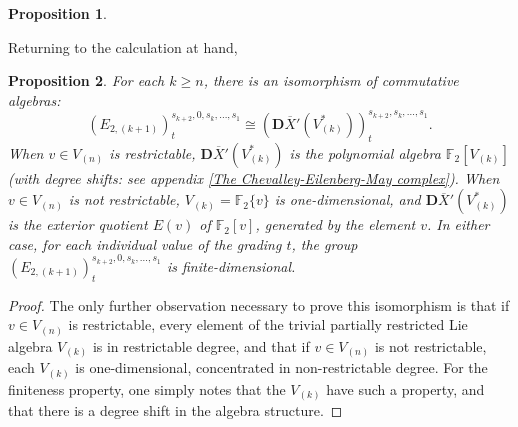 \documentclass[11pt]{amsart}
\theoremstyle{plain}
\newtheorem{thm}{Theorem}[section]
\newtheorem{prop}[thm]{Proposition}
\theoremstyle{definition}
\renewcommand{\to}{\longrightarrow}
\newcommand{\calL}{\mathcal{L}}
\newcommand{\calw}{\mathcal{W}}
\newcommand{\calMv}{\mathcal{M}_\textup{v}}
\newcommand{\calMh}{\mathcal{M}_\textup{h}}
\theoremstyle{plain}
\newcommand{\UEAX}{\overline{X}'}%
\newcommand{\F}{\mathbb{F}}
\newcommand{\Ftwo}{\F_2}
\newcommand{\dual}{\mathbf{D}}
\begin{document}
\begin{Calculations of HWn for n nonzero}
\begin{prop}
\end{prop}
Returning to the calculation at hand,
\begin{prop}\label{calculation in internal dimension zero}
For each $k\geq n$, there is an isomorphism of commutative algebras:
\[(E_{2,(k+1)})^{s_{k+2},0,s_k,\ldots,s_1}_{t}\cong(\dual\UEAX(V^*_{(k)}))^{s_{k+2},s_k,\ldots,s_1}_t.\]
When $v\in V_{(n)}$ is restrictable,  $\dual\UEAX(V^*_{(k)})$ is the polynomial algebra $\Ftwo [V_{(k)}]$ (with degree shifts: see appendix \ref{The Chevalley-Eilenberg-May complex}). When $v\in V_{(n)}$ is not restrictable, $V_{(k)}=\F_{2}\{v\}$ is one-dimensional, and $\dual\UEAX(V^*_{(k)})$ is the exterior quotient $E(v)$ of $\Ftwo [v]$, generated by the element $v$. In either case, for each individual value of the grading $t$, the group $(E_{2,(k+1)})^{s_{k+2},0,s_k,\ldots,s_1}_{t}$ is finite-dimensional.
\end{prop}
\begin{proof}
The only further observation necessary to prove this isomorphism is that if $v\in V_{(n)}$ is restrictable, every element of the trivial partially restricted Lie algebra $V_{(k)}$ is in restrictable degree, and that if $v\in V_{(n)}$ is not restrictable, each $V_{(k)}$ is one-dimensional, concentrated in non-restrictable degree. For the finiteness property, one simply notes that the $V_{(k)}$ have such a property, and that there is a degree shift in the algebra structure.
\end{proof}


\end{Calculations of HWn for n nonzero}
\end{document}
